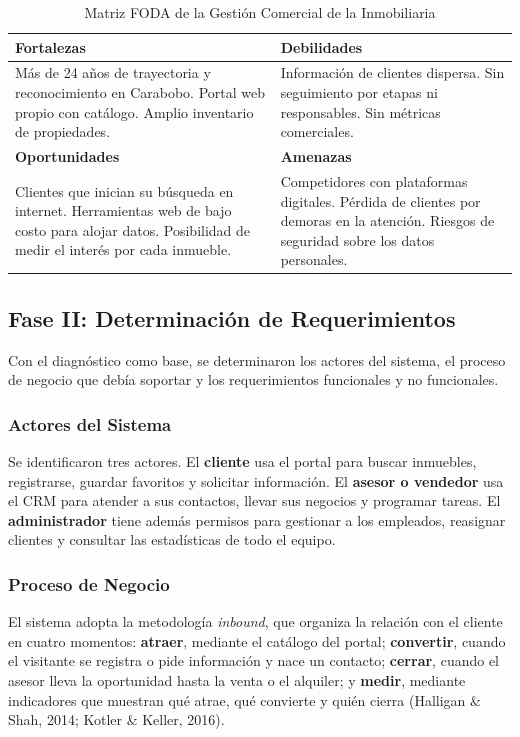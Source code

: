 \documentclass[stu,12pt,letterpaper,donotrepeattitle,floatsintext]{apa7}
\begin{document}
\begin{table}[htbp]
\caption{Matriz FODA de la Gestión Comercial de la Inmobiliaria}
\small
\begin{tabularx}{\linewidth}{>{\hsize}L>{\hsize}L}
\toprule
\textbf{Fortalezas} & \textbf{Debilidades} \\
\midrule
Más de 24 años de trayectoria y reconocimiento en Carabobo. Portal web propio con catálogo. Amplio inventario de propiedades. & Información de clientes dispersa. Sin seguimiento por etapas ni responsables. Sin métricas comerciales. \\
\midrule
\textbf{Oportunidades} & \textbf{Amenazas} \\
\midrule
Clientes que inician su búsqueda en internet. Herramientas web de bajo costo para alojar datos. Posibilidad de medir el interés por cada inmueble. & Competidores con plataformas digitales. Pérdida de clientes por demoras en la atención. Riesgos de seguridad sobre los datos personales. \\
\bottomrule
\end{tabularx}
\end{table}

\subsection{Fase II: Determinación de Requerimientos}

Con el diagnóstico como base, se determinaron los actores del sistema, el proceso de negocio que debía soportar y los requerimientos funcionales y no funcionales.

\subsubsection{Actores del Sistema}

Se identificaron tres actores. El \textbf{cliente} usa el portal para buscar inmuebles, registrarse, guardar favoritos y solicitar información. El \textbf{asesor o vendedor} usa el CRM para atender a sus contactos, llevar sus negocios y programar tareas. El \textbf{administrador} tiene además permisos para gestionar a los empleados, reasignar clientes y consultar las estadísticas de todo el equipo.

\subsubsection{Proceso de Negocio}

El sistema adopta la metodología \textit{inbound}, que organiza la relación con el cliente en cuatro momentos: \textbf{atraer}, mediante el catálogo del portal; \textbf{convertir}, cuando el visitante se registra o pide información y nace un contacto; \textbf{cerrar}, cuando el asesor lleva la oportunidad hasta la venta o el alquiler; y \textbf{medir}, mediante indicadores que muestran qué atrae, qué convierte y quién cierra (Halligan \& Shah, 2014; Kotler \& Keller, 2016).
\end{document}
